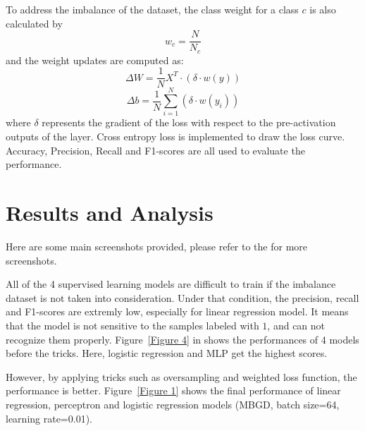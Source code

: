 \documentclass{article}
\begin{document}
To address the imbalance of the dataset, the class weight for a class $c$ is also
calculated by
$$
w_c=\frac{N}{N_c}
$$
and the weight updates are computed as:
$$
\Delta W=\frac{1}{N}X^T\cdot (\delta\cdot w(y))
$$
$$
\Delta b=\frac{1}{N} \sum_{i=1}^N (\delta\cdot w(y_i))
$$
where $\delta$ represents the gradient of the loss with respect to the pre-activation
outputs of the layer. Cross entropy loss is implemented to draw the loss curve.
Accuracy, Precision, Recall and F1-scores are all used to evaluate the performance.

\section{Results and Analysis}
Here are some main screenshots provided, please refer to the  for more screenshots.

All of the 4 supervised learning models are difficult to train if the imbalance dataset
is not taken into consideration. Under that condition, the precision, recall and F1-scores
are extremly low, especially for linear regression model. It means that the model is
not sensitive to the samples labeled with $1$, and can not recognize them properly.
Figure~\ref{Figure 4} in  shows the performances of 4
models before the tricks. Here, logistic regression and MLP get the highest scores.

However, by applying tricks such as oversampling and weighted loss function, the 
performance is better. Figure~\ref{Figure 1} shows the final performance of linear
regression, perceptron and logistic regression models (MBGD, batch size=64, learning rate=0.01).
\end{document}
